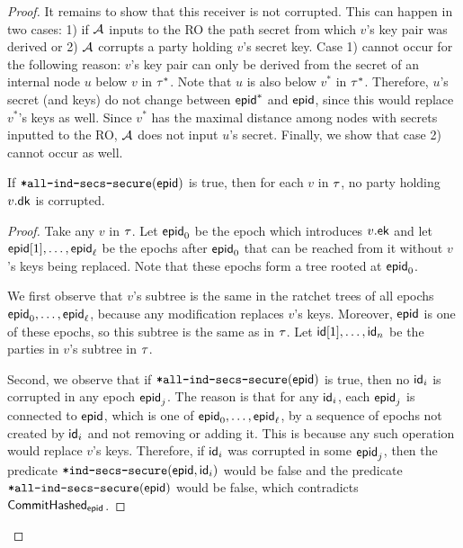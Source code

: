 \begin{proof}
It remains to show that this receiver is not corrupted. This can happen in two cases: 1) if $\mathcal{A}_{\relax}$ inputs to the RO the path secret from which $v$'s key pair was derived or 2) $\mathcal{A}_{\relax}$ corrupts a party holding $v$'s secret key. Case 1) cannot occur for the following reason: $v$'s key pair can only be derived from the secret of an internal node $u$ below $v$ in $\tau^*$. Note that $u$ is also below $v^*$ in $\tau^*$. Therefore, $u$'s secret (and keys) do not change between ${\normalfont\textsf{epid}}^*$ and ${\normalfont\textsf{epid}}$, since this would replace $v^*$'s keys as well. Since $v^*$ has the maximal distance among nodes with secrets inputted to the RO, $\mathcal{A}_{\relax}$ does not input $u$'s secret.
Finally, we show that case 2) cannot occur as well.
\begin{lemma}
  If ${\textnormal{\tt*all-ind-secs-secure}}({\normalfont\textsf{epid}})$ is true, then for each $v$ in $\tau$, no party holding $v.{\mathsf{dk}}$ is corrupted.
\end{lemma}
\begin{proof}
  Take any $v$ in $\tau$. Let ${\normalfont\textsf{epid}}_0$ be the epoch which introduces $v.{\mathsf{ek}}$ and let ${\normalfont\textsf{epid}}[1], \dots, {\normalfont\textsf{epid}}_\ell$ be the epochs after ${\normalfont\textsf{epid}}_0$ that can be reached from it without $v$'s keys being replaced. Note that these epochs form a tree rooted at ${\normalfont\textsf{epid}}_0$.

  We first observe that $v$'s subtree is the same in the ratchet trees of all epochs ${\normalfont\textsf{epid}}_0, \dots, {\normalfont\textsf{epid}}_\ell$, because any modification replaces $v$'s keys. Moreover, ${\normalfont\textsf{epid}}$ is one of these epochs, so this subtree is the same as in $\tau$. Let ${\mathsf{id}}[1], \dots, {\mathsf{id}}_n$ be the parties in $v$'s subtree in $\tau$.

  Second, we observe that if ${\textnormal{\tt*all-ind-secs-secure}}({\normalfont\textsf{epid}})$ is true, then no ${\mathsf{id}}_i$ is corrupted in any epoch ${\normalfont\textsf{epid}}_j$. The reason is that for any ${\mathsf{id}}_i$, each ${\normalfont\textsf{epid}}_j$ is connected to ${\normalfont\textsf{epid}}$, which is one of ${\normalfont\textsf{epid}}_0, \dots, {\normalfont\textsf{epid}}_\ell$, by a sequence of epochs not created by ${\mathsf{id}}_i$ and not removing or adding it. This is because any such operation would replace $v$'s keys. Therefore, if ${\mathsf{id}}_i$ was corrupted in some ${\normalfont\textsf{epid}}_j$, then the predicate ${\textnormal{\tt*ind-secs-secure}}({\normalfont\textsf{epid}}, {\mathsf{id}}_i)$ would be false and the predicate ${\textnormal{\tt*all-ind-secs-secure}}({\normalfont\textsf{epid}})$ would be false, which contradicts $\textnormal{\textsf{CommitHashed}}_{\normalfont\textsf{epid}}$.


\end{proof}
\end{proof}
